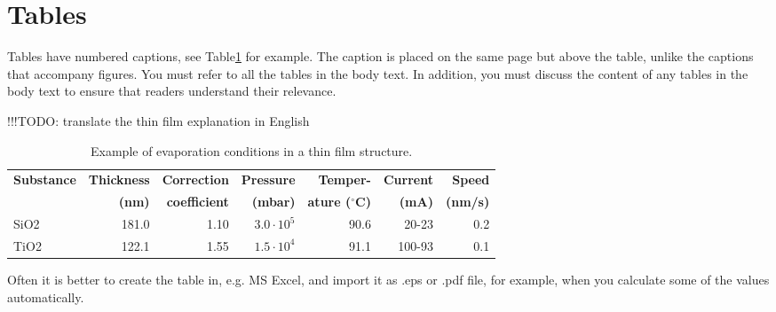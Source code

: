 \documentclass[12pt,a4paper,english
]{tunithesis}
\newcommand\todo[1]{{\color{red}!!!TODO: #1}} %
\begin{document}
\section{Tables}

Tables have numbered captions, see Table\ref{tab:thin_film} for
example. The caption is placed on the same page but above the table,
unlike the captions that accompany figures. You must refer to all the
tables in the body text. In addition, you must discuss the content of
any tables in the body text to ensure that readers understand their
relevance.
%
%

\todo{translate the thin film explanation in English}

\begin{table}[ht]
  \small
  \begin{center}
    \caption{Example of evaporation conditions in a thin film structure.}
    \label{tab:thin_film}
    \begin{tabular}{l | r r r r r r}
      \hline
      \textbf{Substance} & \textbf{Thickness}& \textbf{Correction } & \textbf{Pressure} & \textbf{Temper-}          & \textbf{Current} & \textbf{Speed} \\
                         & \textbf{(nm)}     & \textbf{coefficient} & \textbf{(mbar)}   & \textbf{ature ($^\circ$C)} & \textbf{(mA)}    & \textbf{(nm/s)} \\
      \hline 
      \hline
      SiO2	& 181.0	& 1.10	& $3.0\cdot10^5$	& 90.6	& 20-23	 &0.2 \\
      TiO2	& 122.1	& 1.55	& $1.5\cdot10^4$	& 91.1	& 100-93 &0.1 \\
      \hline
    \end{tabular}
  \end{center}
\end{table}


Often it is better to create the table in, e.g. MS Excel, and import
it as .eps or .pdf file, for example, when you calculate some of the
values automatically.
\end{document}
